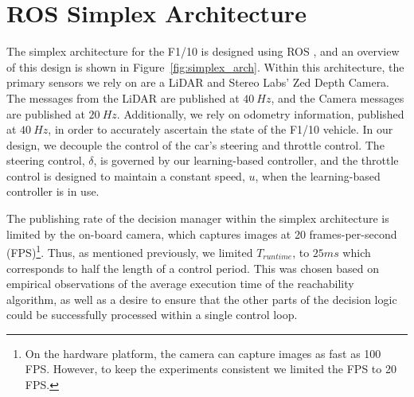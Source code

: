 \documentclass[manuscript,screen,review]{acmart}
\begin{document}
%
%

\section{ROS Simplex Architecture}



\label{section:simplex}
The simplex architecture for the F1/10 is designed using ROS \cite{ROS}, and an overview of this design is shown in Figure~\ref{fig:simplex_arch}. Within this architecture, the primary sensors we rely on are a LiDAR and Stereo Labs' Zed Depth Camera. The messages from the LiDAR are published at $40 \ Hz$, and the Camera messages are published at $20 \ Hz$. Additionally, we rely on odometry information, published at $40 \ Hz$, in order to accurately ascertain the state of the F1/10 vehicle. In our design, we decouple the control of the car's steering and throttle control. The steering control, $\delta$, is governed by our learning-based controller, and the throttle control is designed to maintain a constant speed, $u$, when the learning-based controller is in use. 

The publishing rate of the decision manager within the simplex architecture is limited by the on-board camera, which captures images at 20 frames-per-second (FPS)\footnote{On the hardware platform, the camera can capture images as fast as 100 FPS. However, to keep the experiments consistent we limited the FPS to 20 FPS.}. Thus, as mentioned previously, we limited $T_{runtime}$, to $25 ms$ which corresponds to half the length of a control period. This was chosen based on empirical observations of the average execution time of the reachability algorithm, as well as a desire to ensure that the other parts of the decision logic could be successfully processed within a single control loop.
\end{document}
